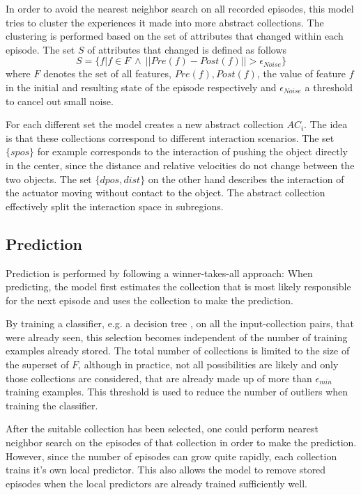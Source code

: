In order to avoid the nearest neighbor search on all recorded episodes, this 
model tries to cluster the experiences it made into more abstract collections.
The clustering is performed based on the set of attributes that changed within 
each episode. The set $S$ of attributes that changed is defined as follows 
\begin{equation}
S = \{f | f \in F ~ \wedge ~ ||Pre(f)-Post(f)|| > \epsilon_{Noise}\}
\end{equation}
where $F$ denotes the set of all features, $Pre(f), Post(f)$, the value of 
feature $f$ in the initial and resulting state of the episode respectively and 
$\epsilon_{Noise}$ a threshold to cancel out small noise.

For each different set the model creates a new abstract collection $AC_i$. The 
idea is that these collections correspond to different interaction scenarios. 
The set $\{spos\}$ for example corresponds to the interaction of pushing the 
object directly in the center, since the distance and relative velocities do not 
change between the two objects. The set $\{dpos, dist\}$ on the other hand 
describes the interaction of the actuator moving without contact to the object. 
The abstract collection effectively split the interaction space in subregions. 

\subsection{Prediction}

Prediction is performed by following a winner-takes-all approach:
When predicting, the model first estimates the collection that is most likely 
responsible for the next episode and uses the collection to make the 
prediction. 

By training a classifier, e.g. a decision tree \cite{DT}, on all the 
input-collection pairs, that were already seen, this selection becomes 
independent of the number of training examples already stored. The total number 
of collections is limited to the size of the superset of $F$, although in 
practice, not all possibilities are likely and only those collections are 
considered, that are already made up of more than $\epsilon_{min}$ training 
examples. 
This threshold is used to reduce the number of outliers when training the 
classifier.  

After the suitable collection has been selected, one could perform nearest 
neighbor search on the episodes of that collection in order to make the 
prediction. However, since the number of episodes can grow quite rapidly, each 
collection trains it's own local predictor. 
This also allows the model to remove stored episodes when the local predictors 
are already trained sufficiently well. 

